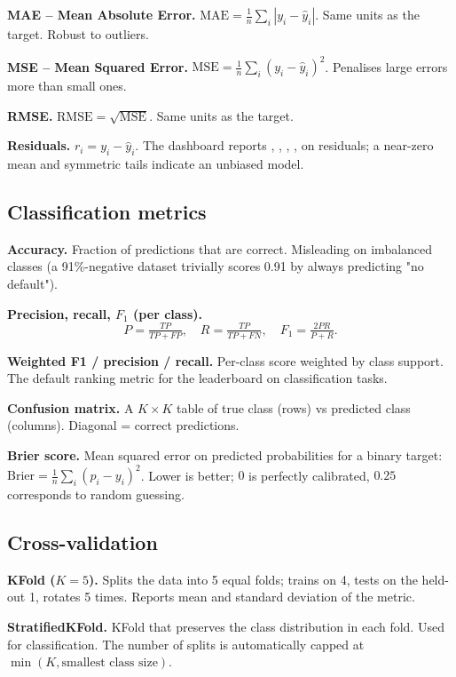 \documentclass[11pt,a4paper]{article}
\newcommand{\code}[1]{\texttt{\detokenize{#1}}}
\begin{document}
\textbf{MAE -- Mean Absolute Error.}
$\mathrm{MAE} = \tfrac{1}{n}\sum_i |y_i - \hat{y}_i|$.
Same units as the target. Robust to outliers.

\textbf{MSE -- Mean Squared Error.}
$\mathrm{MSE} = \tfrac{1}{n}\sum_i (y_i - \hat{y}_i)^2$.
Penalises large errors more than small ones.

\textbf{RMSE.} $\mathrm{RMSE} = \sqrt{\mathrm{MSE}}$. Same units as the target.

\textbf{Residuals.} $r_i = y_i - \hat{y}_i$. The dashboard reports
\code{mean}, \code{median}, \code{std}, \code{min}, \code{max} on residuals;
a near-zero mean and symmetric tails indicate an unbiased model.

\subsection{Classification metrics}

\textbf{Accuracy.} Fraction of predictions that are correct. Misleading on
imbalanced classes (a 91\%-negative dataset trivially scores 0.91 by always
predicting "no default").

\textbf{Precision, recall, $F_1$ (per class).}
\[
P = \tfrac{TP}{TP+FP}, \quad
R = \tfrac{TP}{TP+FN}, \quad
F_1 = \tfrac{2 P R}{P + R}.
\]

\textbf{Weighted F1 / precision / recall.} Per-class score weighted by class
support. The default ranking metric for the leaderboard on classification
tasks.

\textbf{Confusion matrix.} A $K \times K$ table of true class (rows) vs
predicted class (columns). Diagonal = correct predictions.

\textbf{Brier score.} Mean squared error on predicted probabilities for a
binary target:
$\mathrm{Brier} = \tfrac{1}{n}\sum_i (p_i - y_i)^2$. Lower is better; $0$ is
perfectly calibrated, $0.25$ corresponds to random guessing.

\subsection{Cross-validation}

\textbf{KFold ($K=5$).} Splits the data into 5 equal folds; trains on 4,
tests on the held-out 1, rotates 5 times. Reports mean and standard
deviation of the metric.

\textbf{StratifiedKFold.} KFold that preserves the class distribution in
each fold. Used for classification. The number of splits is automatically
capped at $\min(K, \text{smallest class size})$.
\end{document}
